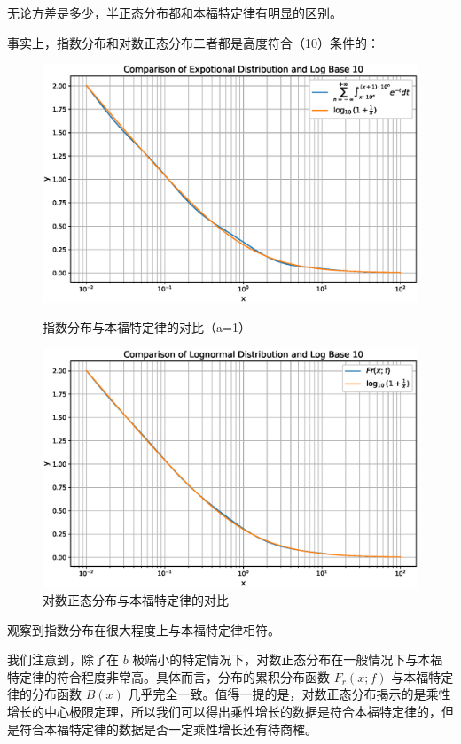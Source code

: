 \documentclass{ctexart} %
\begin{document}
无论方差是多少，半正态分布都和本福特定律有明显的区别。

事实上，指数分布和对数正态分布二者都是高度符合（10）条件的：

\begin{figure}[H]
    \begin{minipage}{0.48\textwidth}
        \includegraphics[width=\textwidth]{exp.eps}
        \caption{指数分布与本福特定律的对比（a=1）}
    \end{minipage}
    \hfill
    \begin{minipage}{0.48\textwidth}
        \includegraphics[width=\textwidth]{log.eps}
        \caption{对数正态分布与本福特定律的对比}
    \end{minipage}
\end{figure}

观察到指数分布在很大程度上与本福特定律相符。

我们注意到，除了在 $ b $ 极端小的特定情况下，对数正态分布在一般情况下与本福特定律的符合程度非常高。具体而言，分布的累积分布函数 $ F_r(x; f) $ 与本福特定律的分布函数 $ B(x) $ 几乎完全一致。值得一提的是，对数正态分布揭示的是乘性增长的中心极限定理，所以我们可以得出乘性增长的数据是符合本福特定律的，但是符合本福特定律的数据是否一定乘性增长还有待商榷。
\end{document}
